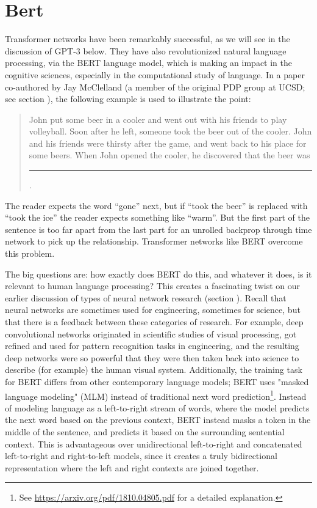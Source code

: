 \section{Bert}

Transformer networks have been remarkably successful, as we will see in the discussion of GPT-3 below. They have also revolutionized natural language processing, via the BERT language model, which is making an impact in the cognitive sciences, especially in the computational study of language. In a paper co-authored by Jay McClelland  \cite{mcclelland2020placing} (a member of the original PDP group at UCSD; see section ), the following example is used to illustrate the point:
\begin{quote}
John put some beer in a cooler and went out with his friends to play volleyball. Soon after he left, someone took the beer out of the cooler. John and his friends were thirsty after the game, and went back to his place for some beers. When John opened the cooler, he discovered that the beer was \rule{1cm}{0.15mm}.
\end{quote}
The reader expects the word ``gone'' next, but if ``took the beer'' is replaced with ``took the ice'' the reader expects something like ``warm''. But the first part of the sentence is too far apart from the last part for an unrolled backprop through time network to pick up the relationship.  Transformer networks like BERT overcome this problem.

The big questions are: how exactly does BERT do this, and whatever it does, is it relevant to human language processing?  This creates a fascinating twist on our earlier discussion of types of neural network research (section ). Recall that neural networks are sometimes used for engineering, sometimes for science, but that there is a feedback between these categories of research. For example, deep convolutional networks originated in scientific studies of visual processing, got refined and used for pattern recognition tasks in engineering, and the resulting deep networks were so powerful that they were then taken back into science  to describe (for example) the human visual system.
Additionally, the training task for BERT differs from other contemporary language models; BERT uses "masked language modeling" (MLM) instead of traditional next word prediction\footnote{See \url{https://arxiv.org/pdf/1810.04805.pdf} for a detailed explanation.}. Instead of modeling language as a left-to-right stream of words, where the model predicts the next word based on the previous context, BERT instead masks a token in the middle of the sentence, and predicts it based on the surrounding sentential context. This is advantageous over unidirectional left-to-right and concatenated left-to-right and right-to-left models, since it creates a truly bidirectional representation where the left and right contexts are joined together.

